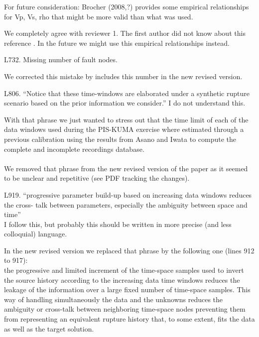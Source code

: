 \documentclass[10pt]{extarticle}
\begin{document}
%
%
\begin{ReviewerComment}{1}
\noindent 
 For future consideration: Brocher (2008,?) provides some empirical relationships for Vp,
 Vs, rho that might be more valid than what was used.
\end{ReviewerComment}
%
\begin{Answer}
 We completely agree with reviewer 1. The first author did not know about this reference
 \citep{Brocher_2008_KER}. In the future we might use this empirical relationships instead.
 \WorkInProgressRevTask
\end{Answer}
%
%
\begin{ReviewerComment}{1}
\noindent 
 L732. Missing number of fault nodes.
\end{ReviewerComment}
%
\begin{Answer}
We corrected this mistake by includes this number in the new revised version.
 \WorkInProgressRevTask
\end{Answer}
%
%
\begin{ReviewerComment}{1}
\noindent 
 L806. ``Notice that these time-windows are elaborated under a synthetic rupture scenario
 based on the prior information we consider.''
 I do not understand this.
\end{ReviewerComment}
%
\begin{Answer}
With that phrase we just wanted to stress out that the time limit of each of the data 
windows used during the PIS-KUMA exercise where estimated through a previous calibration 
using the results from Asano and Iwata to compute the complete and incomplete recordings
database.\\
\\
We removed that phrase from the new revised version of the paper as it seemed to 
be unclear and repetitive (see PDF tracking the changes).
 \WorkInProgressRevTask
\end{Answer}
%
%
\begin{ReviewerComment}{1}
\noindent 
 L919. ``progressive parameter build-up based on increasing data windows reduces the cross-
 talk between parameters, especially the ambiguity between space and time''\\
 I follow this, but probably this should be written in more precise (and less colloquial)
 language.
\end{ReviewerComment}
%
\begin{Answer}
In the new revised version we replaced that phrase by the following one (lines 912 to 917):
\\
the progressive and limited increment of the time-space samples used to invert the 
source history according to the increasing data time windows reduces the leakage of the
information over a large fixed number of time-space samples. This way of handling
simultaneously the data and the unknowns reduces the ambiguity or cross-talk
between neighboring time-space nodes preventing them from representing an equivalent
rupture history that, to some extent, fits the data as well as the target solution.\\
 \WorkInProgressRevTask
\end{Answer}
\end{document}
